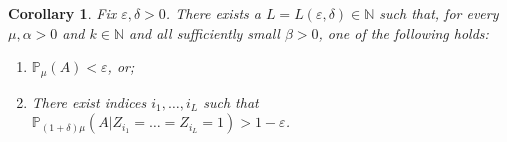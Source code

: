 \documentclass[11pt]{article}%
\newtheorem{corollary}[corollary]{Corollary}
\newcommand{\eN}[0]{\ensuremath{ \mathbb N}}
\newcommand{\Pee}[0]{\ensuremath{{\mathbb P}}}
\newcommand{\eps}{\varepsilon}
\DeclareMathOperator{\dd}{d}
\begin{document}
\begin{corollary}
Fix $\eps,\delta > 0$. There exists a $L=L(\eps,\delta) \in \eN$ such that, for every $\mu,\alpha>0$ and $k \in \eN$ 
and all sufficiently small $\beta>0$, one of
the following holds:

\begin{enumerate}
 \item $\Pee_{\mu}(A) < \eps$, or;
 \item\label{itm:z1} There exist indices $i_1,\dots,i_L$ such that
 $\Pee_{(1+\delta)\mu}( A | Z_{i_1}=\dots=Z_{i_L}=1) > 1-\eps$.
\end{enumerate}
\end{corollary}
\end{document}
